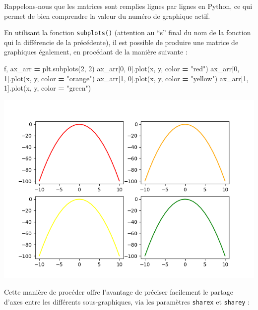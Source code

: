 \documentclass[12pt,]{book}
\newenvironment{Shaded}{\begin{snugshade}}{\end{snugshade}}
\newcommand{\DecValTok}[1]{\textcolor[rgb]{0.00,0.00,0.81}{#1}}
\newcommand{\StringTok}[1]{\textcolor[rgb]{0.31,0.60,0.02}{#1}}
\newcommand{\OperatorTok}[1]{\textcolor[rgb]{0.81,0.36,0.00}{\textbf{#1}}}
\newcommand{\NormalTok}[1]{#1}
\numberwithin{equation}{section}
\numberwithin{countremarque}{section}
\begin{document}
Rappelons-nous que les matrices sont remplies lignes par lignes en
Python, ce qui permet de bien comprendre la valeur du numéro de
graphique actif.

En utilisant la fonction \texttt{subplots()} (attention au ``s'' final
du nom de la fonction qui la différencie de la précédente), il est
possible de produire une matrice de graphiques également, en procédant
de la manière suivante :

\begin{Shaded}
\begin{Highlighting}[]
\NormalTok{f, ax_arr }\OperatorTok{=}\NormalTok{ plt.subplots(}\DecValTok{2}\NormalTok{, }\DecValTok{2}\NormalTok{)}
\NormalTok{ax_arr[}\DecValTok{0}\NormalTok{, }\DecValTok{0}\NormalTok{].plot(x, y, color }\OperatorTok{=} \StringTok{"red"}\NormalTok{)}
\NormalTok{ax_arr[}\DecValTok{0}\NormalTok{, }\DecValTok{1}\NormalTok{].plot(x, y, color }\OperatorTok{=} \StringTok{"orange"}\NormalTok{)}
\NormalTok{ax_arr[}\DecValTok{1}\NormalTok{, }\DecValTok{0}\NormalTok{].plot(x, y, color }\OperatorTok{=} \StringTok{"yellow"}\NormalTok{)}
\NormalTok{ax_arr[}\DecValTok{1}\NormalTok{, }\DecValTok{1}\NormalTok{].plot(x, y, color }\OperatorTok{=} \StringTok{"green"}\NormalTok{)}
\end{Highlighting}
\end{Shaded}

\begin{center}\includegraphics[width=9.03in]{figs/pyplot/subplots} \end{center}

Cette manière de procéder offre l'avantage de préciser facilement le
partage d'axes entre les différents sous-graphiques, via les paramètres
\texttt{sharex} et \texttt{sharey} :
\end{document}
